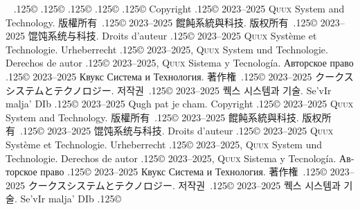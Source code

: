 \documentclass{cookbook}
\begin{document}
{{{~%
{\lower.125\baselineskip\hbox{\copyright}}
{\lower.125\baselineskip\hbox{\copyright}}
{\lower.125\baselineskip\hbox{\copyright}}
{\lower.125\baselineskip\hbox{\copyright}}
{\lower.125\baselineskip\hbox{\copyright}}
Copyright {\lower.125\baselineskip\hbox{\copyright}}
	2023--2025 \textsc{Quux} System and Technology.
版權所有~{\lower.125\baselineskip\hbox{\copyright}}
	2023--2025 餛飩系統與科技.
版权所有~{\lower.125\baselineskip\hbox{\copyright}}
	2023--2025 馄饨系统与科技.
Droits d'auteur {\lower.125\baselineskip\hbox{\copyright}} %
	2023--2025 \textsc{Quux} Système et Technologie.
Urheberrecht {\lower.125\baselineskip\hbox{\copyright}} %
	2023--2025, \textsc{Quux} System und Technologie.
Derechos de autor {\lower.125\baselineskip\hbox{\copyright}} %
	2023--2025, \textsc{Quux} Sistema y Tecnología.
\foreignlanguage{russian}{Авторское право} %
	{\lower.125\baselineskip\hbox{\copyright}}
	2023–2025 \foreignlanguage{russian}{Квукс Система и Технология.}
著作権~{\lower.125\baselineskip\hbox{\copyright}}
	2023--2025 クークスシステムとテクノロジー.
저작권~{\lower.125\baselineskip\hbox{\copyright}}
	2023--2025 퀙스 시스템과 기술.
Se'vIr malja' DIb {\lower.125\baselineskip\hbox{\copyright}} %
	2023--2025 Qugh pat je cham.
Copyright {\lower.125\baselineskip\hbox{\copyright}}
	2023--2025 \textsc{Quux} System and Technology.
版權所有~{\lower.125\baselineskip\hbox{\copyright}}
	2023--2025 餛飩系統與科技.
版权所有~{\lower.125\baselineskip\hbox{\copyright}}
	2023--2025 馄饨系统与科技.
Droits d'auteur {\lower.125\baselineskip\hbox{\copyright}} %
	2023--2025 \textsc{Quux} Système et Technologie.
Urheberrecht {\lower.125\baselineskip\hbox{\copyright}} %
	2023--2025, \textsc{Quux} System und Technologie.
Derechos de autor {\lower.125\baselineskip\hbox{\copyright}} %
	2023--2025, \textsc{Quux} Sistema y Tecnología.
\foreignlanguage{russian}{Авторское право} %
	{\lower.125\baselineskip\hbox{\copyright}}
	2023–2025 \foreignlanguage{russian}{Квукс Система и Технология.}
著作権~{\lower.125\baselineskip\hbox{\copyright}}
	2023--2025 クークスシステムとテクノロジー.
저작권~{\lower.125\baselineskip\hbox{\copyright}}
	2023--2025 퀙스 시스템과 기술.
Se'vIr malja' DIb {\lower.125\baselineskip\hbox{\copyright}} %
}}}
\end{document}
